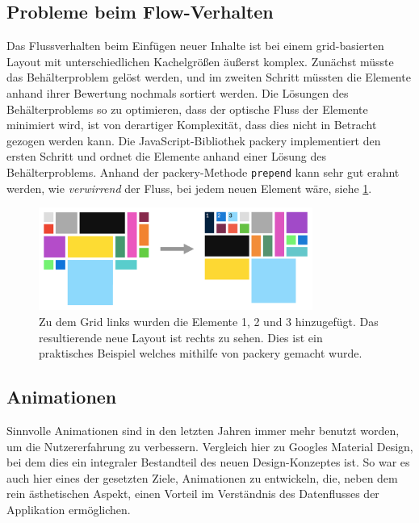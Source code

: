 \documentclass[12pt,twoside]{book}
\begin{document}
\begin{itemize}
  \subsection{Probleme beim Flow-Verhalten}
  Das Flussverhalten beim Einfügen neuer Inhalte ist bei einem grid-basierten Layout mit unterschiedlichen Kachelgrößen äußerst komplex. Zunächst müsste das Behälterproblem gelöst werden, und im zweiten Schritt müssten die Elemente anhand ihrer Bewertung nochmals sortiert werden. Die Lösungen des Behälterproblems so zu optimieren, dass der optische Fluss der Elemente minimiert wird, ist von derartiger Komplexität, dass dies nicht in Betracht gezogen werden kann. Die JavaScript-Bibliothek packery\cite{packery} implementiert den ersten Schritt und ordnet die Elemente anhand einer Lösung des Behälterproblems. Anhand der packery-Methode \texttt{prepend} kann sehr gut erahnt werden, wie \textit{verwirrend} der Fluss, bei jedem neuen Element wäre, siehe \ref{fig:grid_flow}.

  \begin{figure}[h]
    \centering
    \includegraphics[width=0.8\textwidth]{images/grid_flow.png}
    \caption{Zu dem Grid links wurden die Elemente 1, 2 und 3 hinzugefügt. Das resultierende neue Layout ist rechts zu sehen. Dies ist ein praktisches Beispiel welches mithilfe von packery gemacht wurde.}
    \label{fig:grid_flow}
  \end{figure}


\end{itemize}

\subsection{Animationen}

Sinnvolle Animationen sind in den letzten Jahren immer mehr benutzt worden, um die Nutzererfahrung zu verbessern. Vergleich hier zu Googles Material Design, bei dem dies ein integraler Bestandteil des neuen Design-Konzeptes ist.
So war es auch hier eines der gesetzten Ziele, Animationen zu entwickeln, die, neben dem rein ästhetischen Aspekt, einen Vorteil im Verständnis des Datenflusses der Applikation ermöglichen.
\end{document}
